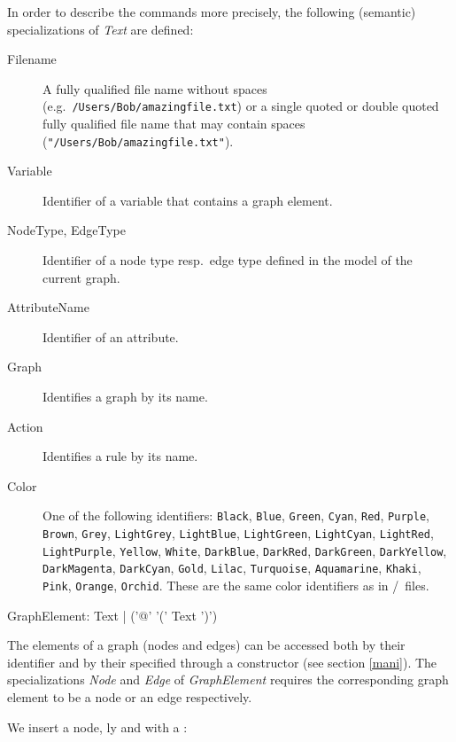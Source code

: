 In order to describe the commands more precisely, the following (semantic) specializations of \emph{Text} are defined:
\begin{description}
  \item[Filename]A fully qualified file name without spaces (e.g.\ \texttt{/Users/Bob/amazing\textunderscore file.txt}) or a single quoted or double quoted fully qualified file name that may contain spaces (\texttt{"/Users/Bob/amazing\textunderscore file.txt"}).
  \item[Variable] Identifier of a variable that contains a graph element. 
  \item[NodeType, EdgeType] Identifier of a node type resp.\ edge type defined in the model of the current graph.
  \item[AttributeName] Identifier of an attribute.
  \item[Graph] Identifies a graph by its name.
  \item[Action] Identifies a rule by its name.
  \item[Color] One of the following  identifiers: \texttt{Black}, \texttt{Blue}, \texttt{Green}, \texttt{Cyan}, \texttt{Red}, \texttt{Purple}, \texttt{Brown}, \texttt{Grey}, \texttt{LightGrey}, \texttt{LightBlue}, \texttt{LightGreen}, \texttt{LightCyan}, \texttt{LightRed}, \texttt{LightPurple}, \texttt{Yellow}, \texttt{White}, \texttt{DarkBlue}, \texttt{DarkRed}, \texttt{DarkGreen}, \texttt{DarkYellow}, \texttt{DarkMagenta}, \texttt{DarkCyan}, \texttt{Gold}, \texttt{Lilac}, \texttt{Turquoise}, \texttt{Aquamarine}, \texttt{Khaki}, \texttt{Pink}, \texttt{Orange}, \texttt{Orchid}. These are the same color identifiers as in /\yComp\ files.
\end{description}
\makeatletter
\begin{rail}
  GraphElement: Text | ('@' '(' Text ')')
\end{rail}
\makeatother
The elements of a graph (nodes and edges) can be accessed both by their  identifier and by their  specified through a constructor (see section \ref{mani}).
The specializations \emph{Node} and \emph{Edge} of \emph{GraphElement} requires the corresponding graph element to be a node or an edge respectively.
\begin{example}
\label{persistentex} 
We insert a node, ly and with a :
\end{example}
